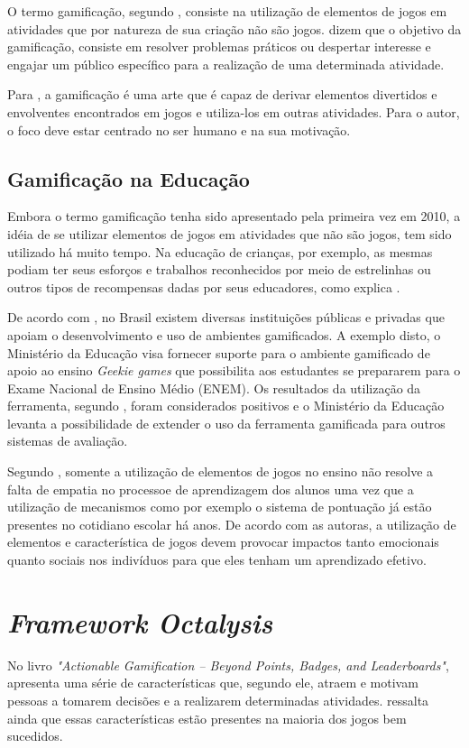 O termo gamificação, segundo , consiste na utilização de elementos de jogos em 
atividades que por natureza de sua criação não são jogos.  dizem que o objetivo da gamificação, consiste em resolver
problemas práticos ou despertar interesse e engajar um público específico para a realização de uma determinada
atividade. 

Para , a gamificação é uma arte que é capaz de derivar elementos divertidos e envolventes encontrados em jogos e utiliza-los
em outras atividades. Para o autor, o foco deve estar centrado no ser humano e na sua motivação.

\subsection{Gamificação na Educação}
Embora o termo gamificação tenha sido apresentado pela primeira vez em 2010, a idéia de se utilizar
elementos de jogos em atividades que não são jogos, tem sido utilizado há muito tempo. Na educação
de crianças, por exemplo, as mesmas podiam ter seus esforços e trabalhos reconhecidos por meio
de estrelinhas ou outros tipos de recompensas dadas por seus educadores, como explica .

De acordo com , no Brasil existem diversas instituições públicas e privadas que apoiam o desenvolvimento e uso de ambientes
gamificados. A exemplo disto, o Ministério da Educação visa fornecer suporte para o ambiente gamificado de apoio ao ensino \textit{Geekie games} que possibilita
aos estudantes se prepararem para o Exame Nacional de Ensino Médio (ENEM). Os resultados da utilização da ferramenta, segundo , 
foram considerados positivos e o Ministério da Educação levanta a possibilidade de extender o uso da ferramenta gamificada para outros sistemas de avaliação.

Segundo , somente a utilização de elementos de jogos no ensino não resolve a falta de empatia no processoe de aprendizagem dos alunos
uma vez que a utilização de mecanismos como por exemplo o sistema de pontuação já estão presentes no cotidiano escolar há anos. De acordo com as autoras, 
a utilização de elementos e característica de jogos devem provocar impactos tanto emocionais quanto sociais nos indivíduos para que eles tenham um aprendizado
efetivo. 

\section{\textit{Framework Octalysis}}
No livro \textit{"Actionable Gamification – Beyond Points, Badges, and Leaderboards"},  apresenta uma série
de características que, segundo ele, atraem e motivam pessoas a tomarem decisões e a realizarem determinadas atividades.
 ressalta ainda que essas características estão presentes na maioria dos jogos bem sucedidos.

